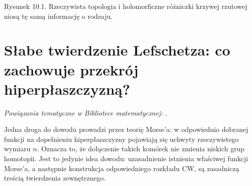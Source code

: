 \begin{center}

{\small Rysunek 10.1. Rzeczywista topologia i holomorficzne różniczki
krzywej rzutowej niosą tę samą informację o rodzaju.}\par
\end{center}

\section{Słabe twierdzenie Lefschetza: co zachowuje przekrój hiperpłaszczyzną?}
\label{sec:ga10-weak}

\noindent\emph{Powiązania tematyczne w Bibliotece matematycznej:} .




\begin{uwaga}
Jedna droga do dowodu prowadzi przez teorię Morse'a:
w odpowiednio dobranej funkcji na dopełnieniu hiperpłaszczyzny
pojawiają się uchwyty rzeczywistego wymiaru $n$.
Oznacza to, że dołączenie takich komórek nie zmienia
niskich grup homotopii. Jest to jedynie idea dowodu:
uzasadnienie istnienia właściwej funkcji Morse'a,
a następnie konstrukcja odpowiedniego rozkładu CW,
są zasadniczą treścią twierdzenia zewnętrznego.
\end{uwaga}

